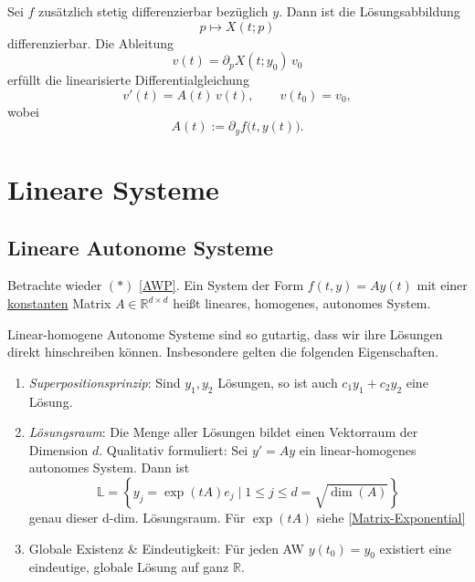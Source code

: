 \documentclass[11pt, a4paper]{article}
\begin{document}
\begin{theorem}
Sei $f$ zusätzlich stetig differenzierbar bezüglich $y$.
Dann ist die Lösungsabbildung
\[
p \longmapsto X(t;p)
\]
differenzierbar. Die Ableitung
\[
v(t)=\partial_p X(t;y_0)\,v_0
\]
erfüllt die linearisierte Differentialgleichung
\[
v'(t)=A(t)\,v(t), \qquad v(t_0)=v_0,
\]
wobei
\[
A(t):=\partial_y f\bigl(t,y(t)\bigr).
\]
\end{theorem}

\newpage
\section{Lineare Systeme}

\vspace{0.3cm} \par \subsection{Lineare Autonome Systeme}


\begin{definition}
    Betrachte wieder $(*)$ \ref{AWP}. Ein System der Form $f(t,y) = Ay(t)$ mit einer \underline{konstanten} Matrix $A \in \mathbb{R}^{d \times d}$
heißt lineares, homogenes, autonomes System.
\end{definition}


\begin{note} Linear-homogene Autonome Systeme sind so gutartig, dass wir ihre Lösungen direkt hinschreiben können. Insbesondere gelten die folgenden Eigenschaften.
    
\begin{enumerate}
\item \emph{Superpositionsprinzip}: Sind $y_1, y_2$ Lösungen, so ist auch $c_1 y_1 + c_2 y_2$ eine Lösung.
\item \emph{Lösungsraum}: Die Menge aller Lösungen bildet einen Vektorraum der Dimension $d$. Qualitativ formuliert: Sei $y'=Ay$ ein linear-homogenes autonomes System. Dann ist
$$\mathbb{L}=\left\{y_j = \exp(tA)e_j\; | \; 1\leq j \leq d = \sqrt{\dim(A)}\right\} $$
genau dieser d-dim. Lösungsraum. Für $\exp(tA)$ siehe \ref{Matrix-Exponential}
\item Globale Existenz \& Eindeutigkeit: Für jeden AW $y(t_0)=y_0$ existiert eine eindeutige, globale Lösung auf ganz $\mathbb{R}$.
\end{enumerate}
\end{note}
\end{document}
